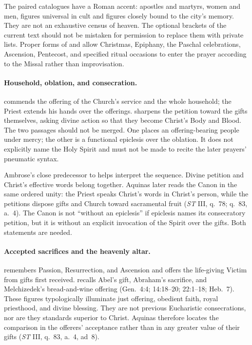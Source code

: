 The paired catalogues have a Roman accent: apostles and martyrs, women and men, figures universal in cult and figures closely bound to the city's memory. They are not an exhaustive census of heaven. The optional brackets of the current text should not be mistaken for permission to replace them with private lists. Proper forms of  and  allow Christmas, Epiphany, the Paschal celebrations, Ascension, Pentecost, and specified ritual occasions to enter the prayer according to the Missal rather than improvisation.

\paragraph{Household, oblation, and consecration.}
 commends the offering of the Church's service and the whole household; the Priest extends his hands over the offerings.  sharpens the petition toward the gifts themselves, asking divine action so that they become Christ's Body and Blood. The two passages should not be merged. One places an offering-bearing people under mercy; the other is a functional epiclesis over the oblation. It does not explicitly name the Holy Spirit and must not be made to recite the later prayers' pneumatic syntax.

Ambrose's close predecessor to  helps interpret the sequence. Divine petition and Christ's effective words belong together. Aquinas later reads the Canon in the same ordered unity: the Priest speaks Christ's words in Christ's person, while the petitions dispose gifts and Church toward sacramental fruit (\emph{ST} III, q.~78; q.~83, a.~4). The Canon is not ``without an epiclesis'' if epiclesis names its consecratory petition, but it is without an explicit invocation of the Spirit over the gifts. Both statements are needed.

\paragraph{Accepted sacrifices and the heavenly altar.}
 remembers Passion, Resurrection, and Ascension and offers the life-giving Victim from gifts first received.  recalls Abel's gift, Abraham's sacrifice, and Melchizedek's bread-and-wine offering (Gen.~4:4; 14:18--20; 22:1--18; Heb.~7). These figures typologically illuminate just offering, obedient faith, royal priesthood, and divine blessing. They are not previous Eucharistic consecrations, nor are they standards superior to Christ. Aquinas therefore locates the comparison in the offerers' acceptance rather than in any greater value of their gifts (\emph{ST} III, q.~83, a.~4, ad~8).

